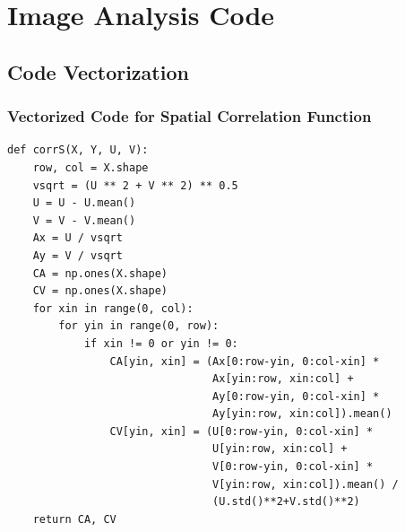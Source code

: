 \chapter{Image Analysis Code}

\section{Code Vectorization}
\subsection{Vectorized Code for Spatial Correlation Function}
\label{sec:A-vectorization}
\begin{verbatim}
def corrS(X, Y, U, V):
    row, col = X.shape
    vsqrt = (U ** 2 + V ** 2) ** 0.5
    U = U - U.mean()
    V = V - V.mean()
    Ax = U / vsqrt
    Ay = V / vsqrt
    CA = np.ones(X.shape)
    CV = np.ones(X.shape)
    for xin in range(0, col):
        for yin in range(0, row):
            if xin != 0 or yin != 0:
                CA[yin, xin] = (Ax[0:row-yin, 0:col-xin] *
                                Ax[yin:row, xin:col] +
                                Ay[0:row-yin, 0:col-xin] *
                                Ay[yin:row, xin:col]).mean()
                CV[yin, xin] = (U[0:row-yin, 0:col-xin] *
                                U[yin:row, xin:col] +
                                V[0:row-yin, 0:col-xin] *
                                V[yin:row, xin:col]).mean() /
                                (U.std()**2+V.std()**2)
    return CA, CV
\end{verbatim}

